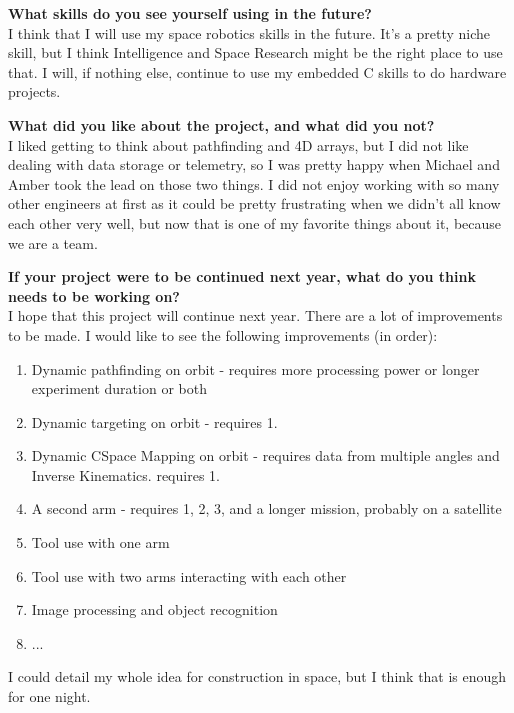 \textbf{What skills do you see yourself using in the future?} \\ 
I think that I will use my space robotics skills in the future. It's a pretty niche skill, but I think Intelligence and Space Research might be the right place to use that. I will, if nothing else, continue to use my embedded C skills to do hardware projects.

\textbf{What did you like about the project, and what did you not?} \\ 
I liked getting to think about pathfinding and 4D arrays, but I did not like dealing with data storage or telemetry, so I was pretty happy when Michael and Amber took the lead on those two things. I did not enjoy working with so many other engineers at first as it could be pretty frustrating when we didn't all know each other very well, but now that is one of my favorite things about it, because we are a team.

\textbf{If your project were to be continued next year, what do you think needs to be working on?} \\ 
I hope that this project will continue next year. There are a lot of improvements to be made. I would like to see the following improvements (in order):

\begin{enumerate}
\item{Dynamic pathfinding on orbit - requires more processing power or longer experiment duration or both}
\item{Dynamic targeting on orbit - requires 1.}
\item{Dynamic CSpace Mapping on orbit - requires data from multiple angles and Inverse Kinematics. requires 1.}
\item{A second arm - requires 1, 2, 3, and a longer mission, probably on a satellite}
\item{Tool use with one arm}
\item{Tool use with two arms interacting with each other}
\item{Image processing and object recognition}
\item{...}
\end{enumerate}
I could detail my whole idea for construction in space, but I think that is enough for one night.

